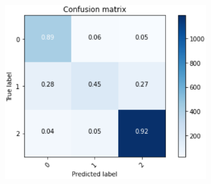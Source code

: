 \documentclass[aspectratio=1610, 9pt]{beamer}
\begin{document}
\begin{frame}
\begin{figure}
\begin{minipage}{\textwidth}
\begin{minipage}{0.4\textwidth}
    \end{minipage}
    \begin{minipage}{0.4\textwidth}
      \includegraphics[width=0.8\textwidth]{images/conf.png}
    \end{minipage}
  \end{minipage}
  \end{figure}
\end{frame}
\end{document}
